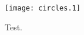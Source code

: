 \documentclass[titlepage,oneside,10pt]{book}
\begin{document}
\raggedbottom


\frontmatter

\mainmatter

\begin{figure}
\begin{center}
\texttt{[image: circles.1]}
\end{center}
\caption{Test.}
\end{figure}


\backmatter
\end{document}
